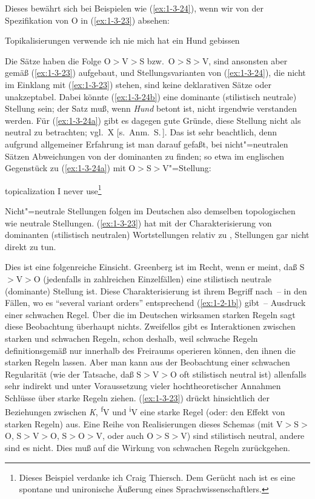 \documentclass[output=paper]{langsci/langscibook}
\begin{document}
Dieses  bewährt sich bei Beispielen wie (\ref{ex:1-3-24}), wenn wir von der Spezifikation von O in (\ref{ex:1-3-23}) absehen:
\begin{exe}
\ex\label{ex:1-3-24}
\begin{xlist}
\ex\label{ex:1-3-24a} Topikalisierungen verwende ich nie
\ex\label{ex:1-3-24b} mich hat ein Hund gebissen
\end{xlist}
\end{exe}
Die Sätze haben die Folge O$>$V$>$S bzw.\ O$>$S$>$V, sind ansonsten aber gemäß (\ref{ex:1-3-23}) aufgebaut, und Stellungsvarianten von (\ref{ex:1-3-24}), die nicht im Einklang mit (\ref{ex:1-3-23}) stehen, sind keine deklarativen Sätze oder unakzeptabel. Dabei könnte (\ref{ex:1-3-24b}) eine dominante (stilistisch neutrale) Stellung sein; der Satz muß, wenn \textit{Hund} betont ist, nicht irgendwie  verstanden werden. Für (\ref{ex:1-3-24a}) gibt es dagegen gute Gründe, diese
Stellung nicht als neutral zu betrachten; vgl.\ X [s.\ Anm.\ S.\,\pageref{fn-herausgeber-topo}].\label{X:5} Das ist sehr beachtlich, denn aufgrund allgemeiner Erfahrung ist man darauf gefaßt, bei nicht"=neutralen Sätzen Abweichungen von der dominanten  zu finden; so etwa im englischen 
Gegenstück zu (\ref{ex:1-3-24a}) mit O$>$S$>$V"=Stellung:
\begin{exe}
\ex\label{ex:1-3-25}
topicalization I never use\footnote{%
  Dieses Beispiel verdanke ich Craig Thiersch. Dem Gerücht nach ist es eine spontane und unironische
  Äußerung eines Sprachwissenschaftlers.%
}
\end{exe}
Nicht"=neutrale Stellungen folgen im Deutschen also demselben topologischen  wie neutrale Stellungen. (\ref{ex:1-3-23}) hat mit der Charakterisierung von dominanten (stilistisch neutralen) Wortstellungen relativ zu ,  Stellungen gar nicht direkt zu tun.

Dies ist eine folgenreiche Einsicht. Greenberg ist im Recht, wenn er meint, daß
S$>$V$>$O (jedenfalls in zahlreichen Einzelfällen) eine stilistisch neutrale (dominante)
Stellung ist. Diese Charakterisierung ist ihrem Begriff nach~-- in den Fällen, wo es
"`several variant orders"' entsprechend (\ref{ex:1-2-1b}) gibt~-- Ausdruck einer schwachen Regel.
Über die im Deutschen wirksamen starken Regeln sagt diese Beobachtung überhaupt nichts. Zweifellos gibt es Interaktionen zwischen starken und schwachen Regeln, schon deshalb, weil schwache Regeln definitionsgemäß nur innerhalb des Freiraums operieren können, den ihnen die starken Regeln lassen. Aber man kann aus
der Beobachtung einer schwachen Regularität (wie der Tatsache, daß S$>$V$>$O oft stilistisch neutral ist) allenfalls sehr indirekt und unter Voraussetzung vieler hochtheoretischer Annahmen Schlüsse über starke Regeln ziehen. (\ref{ex:1-3-23}) drückt hinsichtlich der
Beziehungen zwischen \textit{K}, \textsuperscript{f}V und \textsuperscript{i}V eine starke Regel (oder: den Effekt von starken
Regeln) aus. Eine Reihe von Realisierungen dieses Schemas (mit V$>$S$>$O, S$>$V$>$O,
S$>$O$>$V, oder auch O$>$S$>$V) sind stilistisch neutral, andere sind es nicht. Dies muß
auf die Wirkung von schwachen Regeln zurückgehen.
\end{document}
